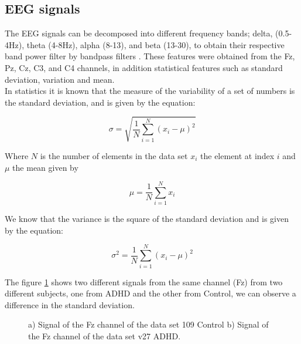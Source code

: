 \documentclass[letterpaper,12pt,openright,oneside]{article}
\begin{document}



\subsection{EEG signals}
The EEG signals can be decomposed into different frequency bands; delta, (0.5-4Hz), theta (4-8Hz), alpha (8-13), and beta (13-30), to obtain their respective band power filter by bandpass filters \cite{SADATNEZHAD20111956}.
These features were obtained from the Fz, Pz, Cz, C3, and C4 channels, in addition statistical features such as standard deviation, variation and mean.\cite{Yag1}\\



In statistics it is known that the measure of the variability of a set of numbers is the standard deviation, and is given by the equation:

\begin{equation}
\sigma = \sqrt{\frac{1}{N}\sum_{i=1}^N (x_i - \mu)^2} 
\end{equation}

Where $N$ is the number of elements in the data set $x_i$ the element at index $i$ and $\mu$ the mean given by

\begin{equation}
\mu = \frac{1}{N} \sum_{i = 1}^N x_i 
\end{equation} 

We know that the variance is the square of the standard deviation and is given by the equation:

\begin{equation}
\sigma^2 = \frac{1}{N}\sum_{i=1}^N (x_i - \mu)^2 
\end{equation}

The figure \ref{fig 102} shows two different signals from the same channel (Fz) from two different subjects, one from ADHD and the other from Control, we can observe a difference in the standard deviation.\\

\begin{figure}[H]
\centerline{}
\caption{a) Signal of the Fz channel of the data set 109 Control b) Signal of the Fz channel of the data set v27 ADHD.}
\label{fig 102}
\end{figure}
\end{document}
